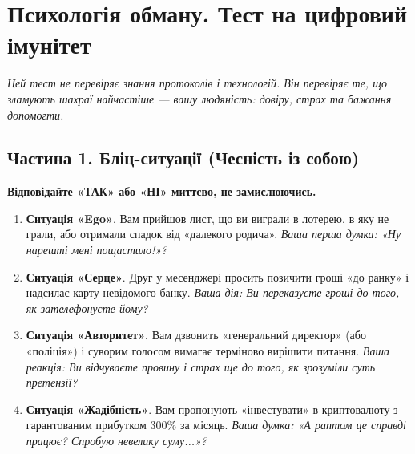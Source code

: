 ﻿%
\chapter{Психологія обману. Тест на цифровий імунітет}
\label{apdx:audit}

\small
\setlength{\parskip}{3pt}

\noindent\textit{Цей тест не перевіряє знання протоколів і технологій. Він перевіряє те, що зламують шахраї найчастіше — вашу людяність: довіру, страх та бажання допомогти.}

\vspace{0.3cm}

\section*{Частина 1. Бліц-ситуації (Чесність із собою)}
\vspace{-0.1cm}

\textbf{Відповідайте «ТАК» або «НІ» миттєво, не замислюючись.}

\vspace{0.2cm}

\begin{enumerate}[leftmargin=2em, itemsep=0pt, parsep=3pt]
    \item \textbf{Ситуація «Ego»}. Вам прийшов лист, що ви виграли в лотерею, в яку не грали, або отримали спадок від «далекого родича». \textit{Ваша перша думка: «Ну нарешті мені пощастило!»?}
    
    \item \textbf{Ситуація «Серце»}. Друг у месенджері просить позичити гроші «до ранку» і надсилає карту невідомого банку. \textit{Ваша дія: Ви переказуєте гроші до того, як зателефонуєте йому?}
    
    \item \textbf{Ситуація «Авторитет»}. Вам дзвонить «генеральний директор» (або «поліція») і суворим голосом вимагає терміново вирішити питання. \textit{Ваша реакція: Ви відчуваєте провину і страх ще до того, як зрозуміли суть претензії?}
    
    \item \textbf{Ситуація «Жадібність»}. Вам пропонують «інвестувати» в криптовалюту з гарантованим прибутком 300\% за місяць. \textit{Ваша думка: «А раптом це справді працює? Спробую невелику суму...»?}
\end{enumerate}

\vspace{0.2cm}

